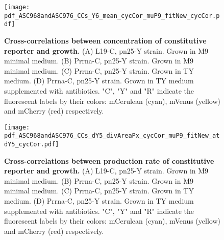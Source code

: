 \begin{figure}
    \centering
    \texttt{[image: pdf\_ASC968andASC976\_CCs\_Y6\_mean\_cycCor\_muP9\_fitNew\_cycCor.pdf]}
    \caption{ 
        \textbf{Cross-correlations between concentration of constitutive reporter and growth.}
        (A) L19-C, pn25-Y strain. Grown in M9 minimal medium.
        (B) Prrna-C, pn25-Y strain. Grown in M9 minimal medium.
        (C) Prrna-C, pn25-Y strain. Grown in TY medium.
        (D) Prrna-C, pn25-Y strain. Grown in TY medium supplemented with antibiotics.
        "C", "Y" and "R" indicate the fluorescent labels by their colors: mCerulean (cyan), mVenus (yellow) and mCherry (red) respectively.
    }
    \label{fig:ribo:CCsEmuYpn25}
\end{figure}

\begin{figure}
    \centering
    \texttt{[image: pdf\_ASC968andASC976\_CCs\_dY5\_divAreaPx\_cycCor\_muP9\_fitNew\_atdY5\_cycCor.pdf]}
    \caption{ 
        \textbf{Cross-correlations between production rate of constitutive reporter and growth.}
        (A) L19-C, pn25-Y strain. Grown in M9 minimal medium.
        (B) Prrna-C, pn25-Y strain. Grown in M9 minimal medium.
        (C) Prrna-C, pn25-Y strain. Grown in TY medium.
        (D) Prrna-C, pn25-Y strain. Grown in TY medium supplemented with antibiotics.
        "C", "Y" and "R" indicate the fluorescent labels by their colors: mCerulean (cyan), mVenus (yellow) and mCherry (red) respectively.
    }
    \label{fig:ribo:CCsPmuYpn25}
\end{figure}



